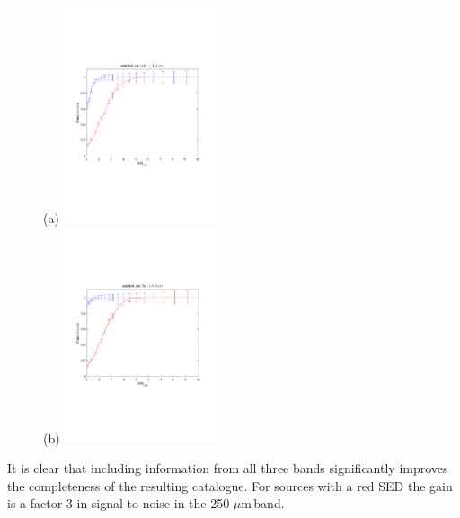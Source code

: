 \documentclass[useAMS,usenatbib]{mn2e}
\def\mic{ $\mu $m\,}
\begin{document}
\begin{figure} 
(a) \includegraphics[valign=t,width=0.4\textwidth]{completeness1_100_111.pdf}\\
(b) \includegraphics[valign=t,width=0.4\textwidth]{completeness_red_sources.pdf}
\caption{}
\label{fig:completeness}
\end{figure}

It is clear that including information from all three bands
significantly improves the completeness of the resulting
catalogue. For sources with a red SED the gain is a factor 3 in
signal-to-noise in the 250\mic band. 
\end{document}
